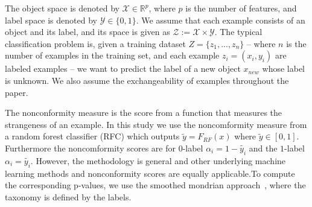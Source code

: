 \documentclass[preprint,12pt,authoryear]{elsarticle}
\begin{document}
The object space is denoted by $\mathcal{X} \in \mathbb{R}^p$, where $p$ is the number of features, and  label space is denoted by $\mathcal{Y} \in \{ 0,1 \}$. We assume that each example consists of an object and its label, and its space is given as $\mathcal{Z} := \mathcal{X} \times \mathcal{Y}$. %
The typical classification problem is, given a training dataset $Z = \{ z_1 , ..., z_n \} $ -- where $n$ is the number of examples in the training set, and each example $z_i = (x_i, y_i)$ are labeled examples -- we want to predict the label of a new object $x_{new}$ whose label is unknown. We also assume the exchangeability of examples throughout the paper.


The nonconformity measure is the score from a function that measures the strangeness of an example. In this study we use the noncomformity measure from a random forest classifier (RFC) which outputs $\tilde{y}=F_{RF}(x)$ where $\tilde{y} \in [0,1]$. Furthermore the noncomformity scores are for $0$-label $\alpha_{i} = 1-\tilde{y_{i}}$ and the $1$-label $\alpha_{i} = \tilde{y_{i}}$. However, the methodology is general and other underlying machine learning methods and nonconformity scores are equally applicable.To compute the corresponding p-values, we use the smoothed mondrian approach~\citep{vovk2005algorithmic}, where the taxonomy is defined by the labels.
\end{document}
